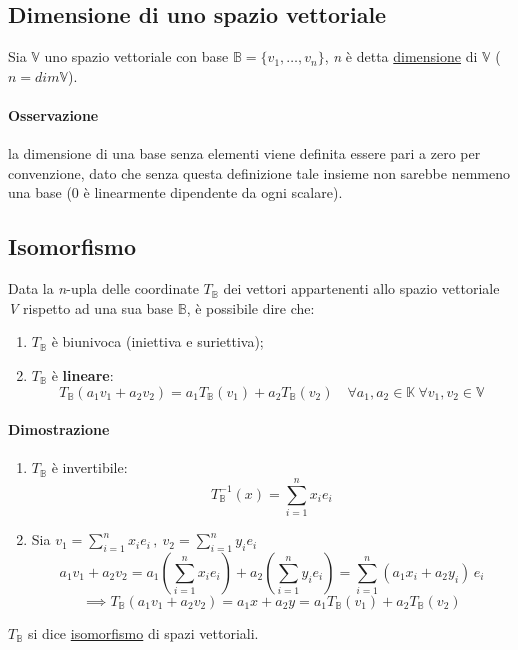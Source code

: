 		\subsection{Dimensione di uno spazio vettoriale}
			Sia $\mathbb{V}$ uno spazio vettoriale con base $\mathbb{B} = \{ v_1, \dots, v_n \}$, \textit{n} è detta \underline{dimensione} di $\mathbb{V}$ ($n = dim \mathbb{V} $).
			
			\paragraph{Osservazione} la dimensione di una base senza elementi viene definita essere pari a zero per convenzione, dato che senza questa definizione tale insieme non sarebbe nemmeno una base (0 è linearmente dipendente da ogni scalare).
		
		\subsection{Isomorfismo}
			Data la \textit{n}-upla delle coordinate $T_{\mathbb{B}}$ dei vettori appartenenti allo spazio vettoriale \textit{V} rispetto ad una sua base $\mathbb{B}$, è possibile dire che:
			\begin{enumerate}
				\item $T_{\mathbb{B}}$ è biunivoca (iniettiva e suriettiva);
				\item $T_{\mathbb{B}}$ è \textbf{lineare}:
				$$T_{\mathbb{B}} (a_1v_1 + a_2v_2) = a_1 T_{\mathbb{B}} (v_1) + a_2 T_{\mathbb{B}} (v_2) \quad \forall a_1, a_2 \in \mathbb{K} \: \forall v_1, v_2 \in \mathbb{V} $$
			\end{enumerate}
		
			\begin{GrayBox}
				\paragraph{Dimostrazione}
				\begin{enumerate}
					\item $T_{\mathbb{B}}$ è invertibile:
					$$T_{\mathbb{B}} ^ {-1} (x) = \sum_{i=1}^{n} x_i e_i$$
					\item Sia $v_1 = \sum_{i=1}^{n} x_i e_i \, , \: v_2 = \sum_{i=1}^{n} y_i e_i$
					$$ a_1 v_1 + a_2 v_2 = a_1 ( \sum_{i=1}^{n} x_i e_i ) + a_2 ( \sum_{i=1}^{n} y_i e_i ) = \sum_{i=1}^{n}(a_1 x_i + a_2 y_i) \, e_i $$
					$$ \implies T_{\mathbb{B}} (a_1 v_1 + a_2 v_2) = a_1 x + a_2 y = a_1 T_{\mathbb{B}} (v_1) + a_2 T_{\mathbb{B}} (v_2) $$
				\end{enumerate}
			\end{GrayBox}
			$T_{\mathbb{B}}$ si dice \underline{isomorfismo} di spazi vettoriali.
			
